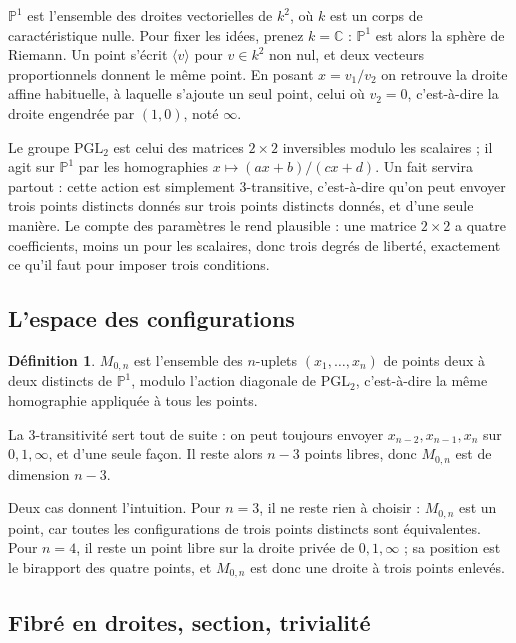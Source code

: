 \documentclass[11pt,a4paper]{amsart}
\theoremstyle{definition}
\newtheorem{definition}{Définition}
\theoremstyle{plain}
\theoremstyle{remark}
\newcommand{\M}{M_{0,n}}
\newcommand{\PP}{\mathbb P^1}
\begin{document}
$\PP$ est l'ensemble des droites vectorielles de $k^2$, où $k$ est un corps de caractéristique nulle. Pour fixer les idées, prenez $k = \mathbb C$ : $\PP$ est alors la sphère de Riemann. Un point s'écrit $\langle v \rangle$ pour $v \in k^2$ non nul, et deux vecteurs proportionnels donnent le même point. En posant $x = v_1/v_2$ on retrouve la droite affine habituelle, à laquelle s'ajoute un seul point, celui où $v_2 = 0$, c'est-à-dire la droite engendrée par $(1,0)$, noté $\infty$.

Le groupe $\mathrm{PGL}_2$ est celui des matrices $2\times 2$ inversibles modulo les scalaires ; il agit sur $\PP$ par les homographies $x \mapsto (ax+b)/(cx+d)$. Un fait servira partout : cette action est simplement $3$-transitive, c'est-à-dire qu'on peut envoyer trois points distincts donnés sur trois points distincts donnés, et d'une seule manière. Le compte des paramètres le rend plausible : une matrice $2\times 2$ a quatre coefficients, moins un pour les scalaires, donc trois degrés de liberté, exactement ce qu'il faut pour imposer trois conditions.

\subsection{L'espace des configurations}

\begin{definition}
$\M$ est l'ensemble des $n$-uplets $(x_1, \dots, x_n)$ de points deux à deux distincts de $\PP$, modulo l'action diagonale de $\mathrm{PGL}_2$, c'est-à-dire la même homographie appliquée à tous les points.
\end{definition}

La $3$-transitivité sert tout de suite : on peut toujours envoyer $x_{n-2}, x_{n-1}, x_n$ sur $0, 1, \infty$, et d'une seule façon. Il reste alors $n-3$ points libres, donc $\M$ est de dimension $n-3$.

Deux cas donnent l'intuition. Pour $n = 3$, il ne reste rien à choisir : $\M$ est un point, car toutes les configurations de trois points distincts sont équivalentes. Pour $n = 4$, il reste un point libre sur la droite privée de $0, 1, \infty$ ; sa position est le birapport des quatre points, et $\M$ est donc une droite à trois points enlevés.

\subsection{Fibré en droites, section, trivialité}
\end{document}
